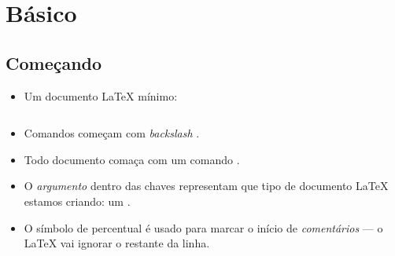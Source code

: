 \documentclass{beamer}
\begin{document}
\section{Básico}

\subsection{Começando}
\begin{frame}[fragile]{\insertsubsection}
\begin{itemize}
	\item Um documento \LaTeX{} mínimo:
		\inputminted[frame=single]{latex}{basics.tex}
	
	\item Comandos começam com  \emph{backslash} \keystrokebftt{\bs}.
	\item Todo documento comaça com um comando .
	\item O \emph{argumento} dentro das chaves \keystrokebftt{\{} \keystrokebftt{\}} representam que tipo de documento \LaTeX{} estamos criando: um .
	\item O símbolo de percentual \keystrokebftt{\%} é usado para marcar o início de \emph{comentários} --- o \LaTeX{} vai ignorar o restante da linha.
\end{itemize}
\end{frame}
\end{document}
